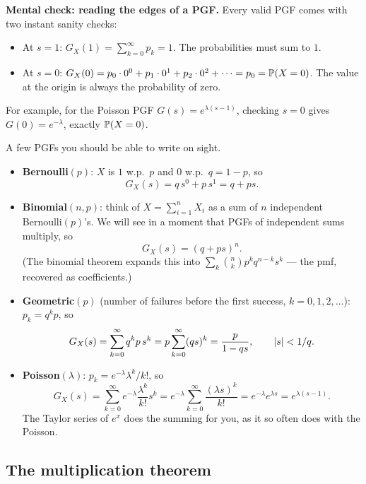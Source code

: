\begin{recoverybox}
\textbf{Mental check: reading the edges of a PGF.}
Every valid PGF comes with two instant sanity checks:
\begin{itemize}
  \item At $s=1$: $G_X(1) = \sum_{k=0}^\infty p_k = 1$. The probabilities must sum to $1$.
  \item At $s=0$: $G_X(0) = p_0 \cdot 0^0 + p_1 \cdot 0^1 + p_2 \cdot 0^2 + \cdots = p_0 = \P(X=0)$. The value at the origin is always the probability of zero.
\end{itemize}
For example, for the Poisson PGF $G(s) = e^{\lambda(s-1)}$, checking $s=0$ gives $G(0) = e^{-\lambda}$, exactly $\P(X=0)$.
\end{recoverybox}

\begin{example}
\label{ch18:ex-pgfs}
A few PGFs you should be able to write on sight.
\begin{itemize}
  \item \textbf{Bernoulli}$(p)$: $X$ is $1$ w.p.\ $p$ and $0$ w.p.\ $q=1-p$, so
        \[
          G_X(s) = q\,s^0 + p\,s^1 = q + p s .
        \]
  \item \textbf{Binomial}$(n,p)$: think of $X=\sum_{i=1}^n X_i$ as a sum of $n$
        independent Bernoulli$(p)$'s. We will see in a moment that PGFs of
        independent sums multiply, so
        \[
          G_X(s) = (q+ps)^n .
        \]
        (The binomial theorem expands this into
        $\sum_k \binom{n}{k}p^k q^{n-k}s^k$ --- the pmf, recovered as
        coefficients.)
  \item \textbf{Geometric}$(p)$ (number of failures before the first success,
        $k=0,1,2,\dots$): $p_k = q^k p$, so
        \[
          G_X(s) = \sum_{k=0}^\infty q^k p\, s^k
                 = p\sum_{k=0}^\infty (qs)^k = \frac{p}{1-qs},
          \qquad \abs{s}<1/q .
        \]
  \item \textbf{Poisson}$(\lambda)$: $p_k = e^{-\lambda}\lambda^k/k!$, so
        \[
          G_X(s) = \sum_{k=0}^\infty e^{-\lambda}\frac{\lambda^k}{k!}s^k
                 = e^{-\lambda}\sum_{k=0}^\infty \frac{(\lambda s)^k}{k!}
                 = e^{-\lambda}e^{\lambda s} = e^{\lambda(s-1)} .
        \]
        The Taylor series of $e^x$ does the summing for you, as it so often
        does with the Poisson.
\end{itemize}
\end{example}

\subsection{The multiplication theorem}

